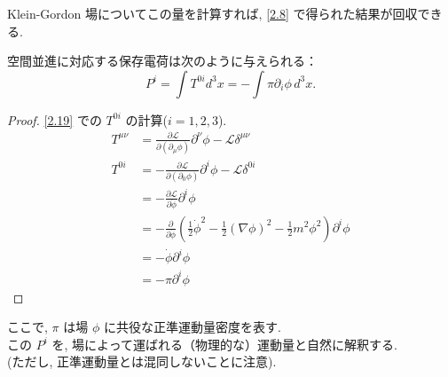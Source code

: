 \documentclass[a4paper,12pt]{article}
\begin{document}
\color{black}

Klein-Gordon 場についてこの量を計算すれば, \eqref{2.8} で得られた結果が回収できる.

空間並進に対応する保存電荷は次のように与えられる：
\begin{equation*}\label{2.19}
P^i = \int T^{0i} d^3x = -\int \pi \partial_i \phi \, d^3x.
\tag{2.19}
\end{equation*}

\color{blue}    

\begin{proof}
\eqref{2.19} での $T^{0i}$ の計算($i = 1,2,3$).
\begin{align*}
    T^{\mu\nu} &= \frac{\partial \mathcal{L}}{\partial (\partial_\mu \phi)} \partial^\nu \phi - \mathcal{L} \delta^{\mu\nu} \tag{2-2.k1}\\
    T^{0i} &= -\frac{\partial \mathcal{L}}{\partial (\partial_0 \phi)} \partial^i \phi - \mathcal{L} \delta^{0i} \tag{2-2.k2}\\
    &= -\frac{\partial \mathcal{L}}{\partial \dot{\phi}} \partial^i \phi \tag{2-2.k3}\\
    &= -\frac{\partial}{\partial \dot{\phi}} \left( \frac{1}{2} \dot{\phi}^2 -\frac{1}{2} (\nabla \phi)^2 - \frac{1}{2} m^2 \phi^2 \right) \partial^i \phi \tag{2-2.k4}\\
    &= -\dot{\phi} \partial^i \phi \tag{2-2.k5}\\
    &= -\pi \partial^i \phi \tag{2-2.k6}
\end{align*}
\end{proof}

\color{black}

ここで, $\pi$ は場 $\phi$ に共役な正準運動量密度を表す.\\
この $P^i$ を, 場によって運ばれる（物理的な）運動量と自然に解釈する.\\
(ただし, 正準運動量とは混同しないことに注意).
\end{document}
